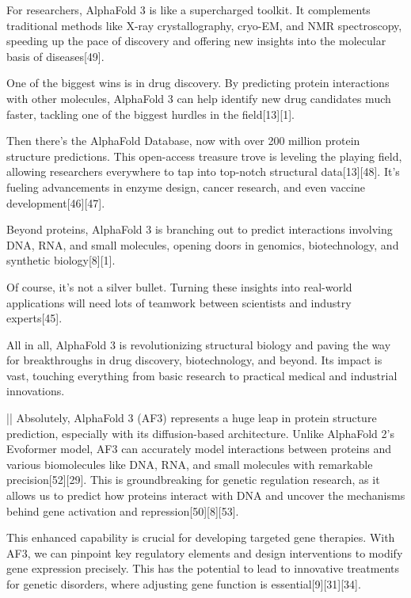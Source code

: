 \begin{showcase}[title=Topic: AlphaFold 3]
For researchers, AlphaFold 3 is like a supercharged toolkit. It complements traditional methods like X-ray crystallography, cryo-EM, and NMR spectroscopy, speeding up the pace of discovery and offering new insights into the molecular basis of diseases[49]. 

One of the biggest wins is in drug discovery. By predicting protein interactions with other molecules, AlphaFold 3 can help identify new drug candidates much faster, tackling one of the biggest hurdles in the field[13][1].

Then there's the AlphaFold Database, now with over 200 million protein structure predictions. This open-access treasure trove is leveling the playing field, allowing researchers everywhere to tap into top-notch structural data[13][48]. It's fueling advancements in enzyme design, cancer research, and even vaccine development[46][47].

Beyond proteins, AlphaFold 3 is branching out to predict interactions involving DNA, RNA, and small molecules, opening doors in genomics, biotechnology, and synthetic biology[8][1].

Of course, it's not a silver bullet. Turning these insights into real-world applications will need lots of teamwork between scientists and industry experts[45].

All in all, AlphaFold 3 is revolutionizing structural biology and paving the way for breakthroughs in drug discovery, biotechnology, and beyond. Its impact is vast, touching everything from basic research to practical medical and industrial innovations.

||
Absolutely, AlphaFold 3 (AF3) represents a huge leap in protein structure prediction, especially with its diffusion-based architecture. Unlike AlphaFold 2's Evoformer model, AF3 can accurately model interactions between proteins and various biomolecules like DNA, RNA, and small molecules with remarkable precision[52][29]. This is groundbreaking for genetic regulation research, as it allows us to predict how proteins interact with DNA and uncover the mechanisms behind gene activation and repression[50][8][53].

This enhanced capability is crucial for developing targeted gene therapies. With AF3, we can pinpoint key regulatory elements and design interventions to modify gene expression precisely. This has the potential to lead to innovative treatments for genetic disorders, where adjusting gene function is essential[9][31][34].


\end{showcase}
